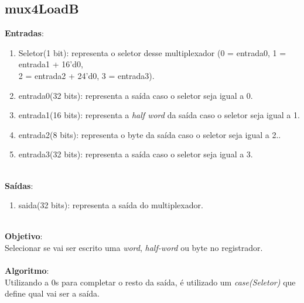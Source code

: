 \documentclass{article}
\begin{document}
    \subsection{mux4LoadB}
    \textbf{Entradas}:
    \begin{enumerate}
        \item Seletor(1 bit): representa o seletor desse multiplexador (0 = entrada0, 1 = entrada1 + 16'd0, \\2 = entrada2 + 24'd0, 3 = entrada3).
        \item entrada0(32 bits): representa a saída caso o seletor seja igual a 0.
        \item entrada1(16 bits): representa a {\it half word} da saída caso o seletor seja igual a 1.
        \item entrada2(8 bits): representa o byte da saída caso o seletor seja igual a 2..
        \item entrada3(32 bits): representa a saída caso o seletor seja igual a 3.\\
    \end{enumerate}
    \\
    \textbf{Saídas}:
    \begin{enumerate}
        \item saida(32 bits): representa a saída do multiplexador.\\
    \end{enumerate}
    \\
    \textbf{Objetivo}:\\
    Selecionar se vai ser escrito uma {\it word}, {\it half-word} ou byte no registrador.
    \\
    \\
    \textbf{Algoritmo}:\\
    Utilizando a 0s para completar o resto da saída, é utilizado um {\it case(Seletor)} que define qual vai ser a saída.
    
    \newpage
\end{document}
